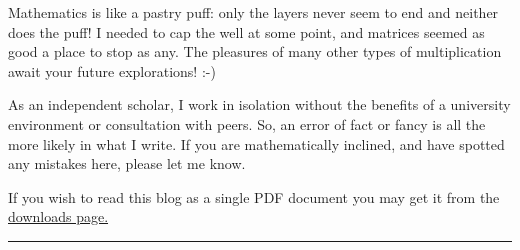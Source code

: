 \documentclass[
  a4paper,
]{article}
\begin{document}
Mathematics is like a pastry puff: only the layers never seem to end and
neither does the puff! I needed to cap the well at some point, and
matrices seemed as good a place to stop as any. The pleasures of many
other types of multiplication await your future explorations! :-)

As an independent scholar, I work in isolation without the benefits of a
university environment or consultation with peers. So, an error of fact
or fancy is all the more likely in what I write. If you are
mathematically inclined, and have spotted any mistakes here, please let
me know.

If you wish to read this blog as a single PDF document you may get it
from the \href{http://swanlotus.org/downloads}{downloads page.}

\begin{center}\rule{0.5\linewidth}{0.5pt}\end{center}
\end{document}
